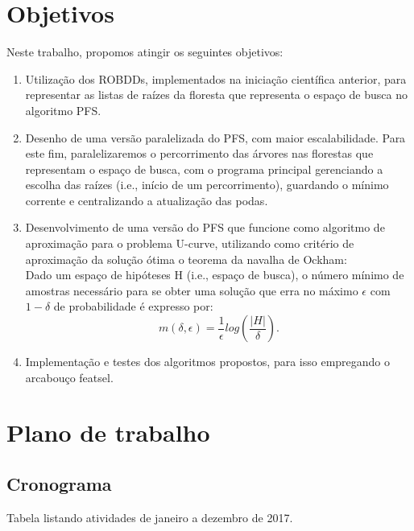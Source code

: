 \documentclass[12pt]{article}
\begin{document}
\section{Objetivos}
Neste trabalho, propomos atingir os seguintes objetivos:

\begin{enumerate}
\item Utilização dos ROBDDs, implementados na iniciação científica
anterior, para representar as listas de raízes da floresta que 
representa o espaço de busca no algoritmo PFS.

\item Desenho de uma versão paralelizada do PFS, com maior
escalabilidade. Para este fim, paralelizaremos o percorrimento das
árvores nas florestas que representam o espaço de busca, com o programa
principal gerenciando a escolha das raízes (i.e., início de um 
percorrimento), guardando o mínimo corrente e centralizando a
atualização das podas.

\item Desenvolvimento de uma versão do PFS que funcione como algoritmo 
de aproximação para o problema U-curve, utilizando como critério de
aproximação da solução ótima o teorema da navalha de Ockham:\\
\smallskip
Dado um espaço de hipóteses H (i.e., espaço de busca), o número mínimo 
de amostras necessário para se obter uma solução que erra no máximo 
$\epsilon$ com $1 - \delta$ de probabilidade é expresso por:
\begin{equation}
\displaystyle  m(\delta,\epsilon) = 
    \frac{1}{\epsilon} log (\frac{|H|}{\delta}).
\end{equation}

\item Implementação e testes dos algoritmos propostos, para isso
empregando o arcabouço featsel.
\end{enumerate}


\section{Plano de trabalho}
\subsection{Cronograma}
Tabela listando atividades de janeiro a dezembro de 2017.
\end{document}
